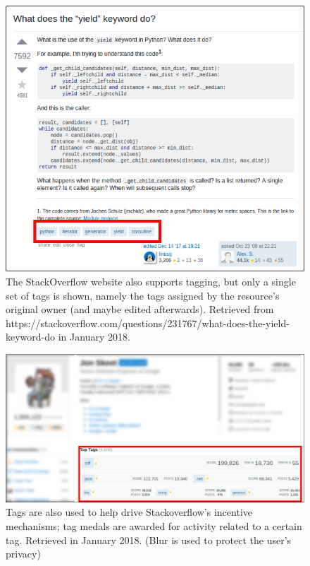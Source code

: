 \begin{figure}[!h]
    \centering
    \includegraphics[width=\textwidth]{chapters/02_social_tagging/images/stackoverflow.png}
    \caption{The StackOverflow website also supports tagging, but only a single set of tags is shown, namely the tags assigned by the resource's original owner (and maybe edited afterwards). Retrieved from https://stackoverflow.com/questions/231767/what-does-the-yield-keyword-do in January 2018. }
    \label{fig:stackoverflow}
\end{figure}

\begin{figure}[!h]
    \centering
    \includegraphics[width=\textwidth]{chapters/02_social_tagging/images/jon_skeet.png}
    \caption{Tags are also used to help drive Stackoverflow's incentive mechanisms; tag medals are awarded for activity related to a certain tag. Retrieved in January 2018. (Blur is used to protect the user's privacy)}
    \label{fig:jon_skeet}
\end{figure}

